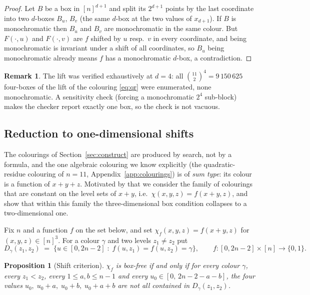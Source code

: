 \documentclass[11pt]{article}
\newtheorem{proposition}[theorem]{Proposition}
\theoremstyle{definition}
\newtheorem{remark}[theorem]{Remark}
\begin{document}
\begin{proof}
Let $B$ be a box in $[n]^{d+1}$ and split its $2^{d+1}$ points by the last coordinate
into two $d$-boxes $B_u$, $B_v$ (the same $d$-box at the two values of $x_{d+1}$). If $B$
is monochromatic then $B_u$ and $B_v$ are monochromatic in the same colour. But
$F(\cdot,u)$ and $F(\cdot,v)$ are $f$ shifted by $u$ resp.\ $v$ in every coordinate, and
being monochromatic is invariant under a shift of all coordinates, so $B_u$ being
monochromatic already means $f$ has a monochromatic $d$-box, a contradiction.
\end{proof}

\begin{remark}
The lift was verified exhaustively at $d=4$: all $\binom{11}{2}^4=9\,150\,625$ four-boxes
of the lift of the colouring \eqref{eq:qr} were enumerated, none monochromatic. A
sensitivity check (forcing a monochromatic $2^4$ sub-block) makes the checker report
exactly one box, so the check is not vacuous.
\end{remark}

\subsection{Reduction to one-dimensional shifts}\label{sec:1dshift}

The colourings of Section~\ref{sec:construct} are produced by search, not by a formula,
and the one algebraic colouring we know explicitly (the quadratic-residue colouring of
$n=11$, Appendix~\ref{app:colourings}) is of \emph{sum type}: its colour is a function of
$x+y+z$. Motivated by that we consider the family of colourings that are constant on the
level sets of $x+y$, i.e.\ $\chi(x,y,z)=f(x+y,z)$, and show that within this family the
three-dimensional box condition collapses to a two-dimensional one.

Fix $n$ and a function $f$ on the set below, and set
$\chi_f(x,y,z)=f(x+y,z)$ for $(x,y,z)\in[n]^3$. For a colour $\gamma$ and two levels
$z_1\neq z_2$ put
\[
D_\gamma(z_1,z_2)\;=\;\bigl\{u\in[0,2n-2]\;:\;f(u,z_1)=f(u,z_2)=\gamma\bigr\}, \qquad
f\colon[0,2n-2]\times[n]\to\{0,1\}.
\]

\begin{proposition}[Shift criterion]\label{prop:1dshift}
$\chi_f$ is box-free if and only if for every colour $\gamma$, every $z_1<z_2$, every
$1\le a,b\le n-1$ and every $u_0\in[0,\,2n-2-a-b]$, the four values
$u_0,\;u_0+a,\;u_0+b,\;u_0+a+b$ are \emph{not} all contained in $D_\gamma(z_1,z_2)$.
\end{proposition}
\end{document}
